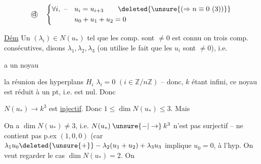 \[
\text{\textcircled{d}}\quad
\left\{\begin{aligned}
\forall i,\ \text{--}\quad &u_i=u_{i+3}\qquad\deleted{\unsure{(\Rightarrow n\equiv0\ (3))}}\\
&u_0+u_1+u_2=0
\end{aligned}\right.
\]

\endgroup



\uline{Dém} Un $(\lambda_i)\in N(u_*)$ tel que les comp. sont $\ne0$ est connu  on  trois comp. consécutives, disons $\lambda_1,\lambda_2,\lambda_3$ (on utilise le fait que les $u_i$ sont $\ne0$),  i.e.


a un noyau


\uline{}\quad {}   la réunion des hyperplans $H_i$    $\lambda_i=0$ $(i\in\mathbb Z/n\mathbb Z)$ -- donc, $k$ étant infini,  ce noyau est réduit à un pt, i.e. est nul. Donc

$N(u_*)\to k^3$ est \uline{injectif}. Donc $1\leq\dim N(u_*)\leq3$. Mais 

On a $\dim N(u_*)\ne3$, i.e. $N(u_*)\mathbin{\unsure{-|\to}}k^3$ n'est pas surjectif --   ne contient pas p.ex $(1,0,0)$ (car $\lambda_1u_0\deleted{\unsure{+}}-\lambda_2(u_1+u_2)+\lambda_3u_3$ implique $u_0=0$,  à l'hyp. On veut regarder le cas $\dim N(u_*)=2$. On

